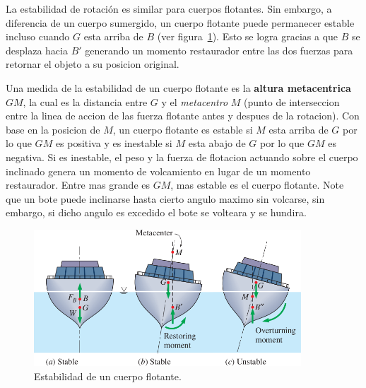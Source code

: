 \documentclass[10pt, oneside]{article}
\begin{document}
La estabilidad de rotaci\'on es similar para cuerpos flotantes. Sin embargo, a diferencia de un cuerpo sumergido, un cuerpo flotante puede permanecer estable incluso cuando $G$ esta arriba de $B$ (ver figura~\ref{rota3}). Esto se logra gracias a que $B$ se desplaza hacia $B'$ generando un momento restaurador entre las dos fuerzas para retornar el objeto a su posicion  original. 

Una medida de la estabilidad de un cuerpo flotante es la \textbf{altura metacentrica} $GM$, la cual es la distancia entre $G$ y el \emph{metacentro} $M$ (punto de interseccion entre la linea de accion de las fuerza flotante antes y despues de la rotacion). Con base en la posicion de $M$, un cuerpo flotante es estable si $M$ esta arriba de $G$ por lo que $GM$ es positiva y es inestable si $M$ esta abajo de $G$ por lo que $GM$ es negativa. Si es inestable, el peso y la fuerza de flotacion actuando sobre el cuerpo inclinado genera un momento de volcamiento en lugar de un momento restaurador. Entre mas grande es $GM$, mas estable es el cuerpo flotante. Note que un bote puede inclinarse hasta cierto angulo maximo sin volcarse, sin embargo, si dicho angulo es excedido el bote se volteara y se hundira.  
\begin{figure}[h]
\centering
\includegraphics[width=10cm]{rota3}
\caption{Estabilidad de un cuerpo flotante.}
\label{rota3}
\end{figure}

\end{document}
